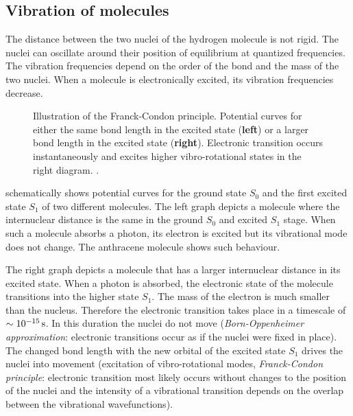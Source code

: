 \subsection{Vibration of molecules}
The distance between the two nuclei of the hydrogen molecule is not
rigid. The nuclei can oscillate around their position of equilibrium
at quantized frequencies. The vibration frequencies depend on the
order of the bond and the mass of the two nuclei. When a molecule is
electronically excited, its vibration frequencies decrease.
\begin{figure}[!hbt]
  \centering
  
  \caption{Illustration of the Franck-Condon principle. Potential
    curves for either the same bond length in the
    excited state ({\bf left}) or a larger bond length in the
    excited state ({\bf right}). Electronic transition occurs
    instantaneously and excites higher vibro-rotational states in the
    right diagram. \citep[inspired from][p.~276]{Haken2006}.}
  \label{fig:flu-condon}
\end{figure}

 schematically shows potential curves for the
ground state $S_0$ and the first excited state $S_1$ of two different
molecules. The left graph depicts a molecule where the internuclear
distance is the same in the ground $S_0$ and excited $S_1$ stage. When
such a molecule absorbs a photon, its electron is excited but its
vibrational mode does not change. The anthracene molecule shows such
behaviour.

The right graph depicts a molecule that has a larger internuclear
distance in its excited state. When a photon is absorbed, the
electronic state of the molecule transitions into the higher state
$S_1$. The mass of the electron is much smaller than the
nucleus. Therefore the electronic transition takes place in a
timescale of $\unit[\sim10^{-15}]{s}$. In this duration the nuclei do
not move (\emph{Born-Oppenheimer approximation}: electronic
transitions occur as if the nuclei were fixed in place). The changed
bond length with the new orbital of the excited state $S_1$ drives the
nuclei into movement (excitation of vibro-rotational modes,
\emph{Franck-Condon principle}: electronic transition most likely
occurs without changes to the position of the nuclei and the intensity
of a vibrational transition depends on the overlap between the
vibrational wavefunctions).

